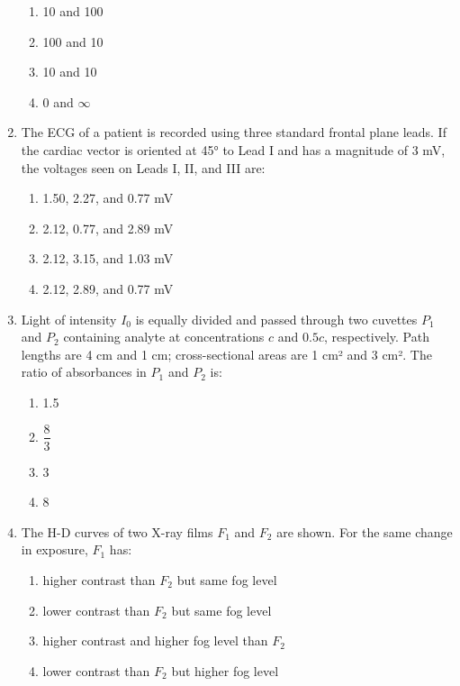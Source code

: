 \documentclass[journal]{IEEEtran}
\begin{document}
\begin{enumerate}
\begin{multicols}{2}
\begin{enumerate}
    \item 10 and 100
    \item 100 and 10
    \item 10 and 10
    \item 0 and $\infty$
\end{enumerate}
\end{multicols}

\item The ECG of a patient is recorded using three standard frontal plane leads. If the cardiac vector is oriented at 45° to Lead I and has a magnitude of 3 mV, the voltages seen on Leads I, II, and III are:

\begin{multicols}{2}
\begin{enumerate}
    \item 1.50, 2.27, and 0.77 mV
    \item 2.12, 0.77, and 2.89 mV
    \item 2.12, 3.15, and 1.03 mV
    \item 2.12, 2.89, and 0.77 mV
\end{enumerate}
\end{multicols}

\item Light of intensity $I_0$ is equally divided and passed through two cuvettes $P_1$ and $P_2$ containing analyte at concentrations $c$ and $0.5c$, respectively. Path lengths are 4 cm and 1 cm; cross-sectional areas are 1 cm² and 3 cm². The ratio of absorbances in $P_1$ and $P_2$ is:

\begin{multicols}{2}
\begin{enumerate}
    \item 1.5
    \item $\dfrac{8}{3}$
    \item 3
    \item 8
\end{enumerate}
\end{multicols}

\item The H-D curves of two X-ray films $F_1$ and $F_2$ are shown. For the same change in exposure, $F_1$ has:

\begin{multicols}{2}
\begin{enumerate}
    \item higher contrast than $F_2$ but same fog level
    \item lower contrast than $F_2$ but same fog level
    \item higher contrast and higher fog level than $F_2$
    \item lower contrast than $F_2$ but higher fog level
\end{enumerate}
\end{multicols}


\end{enumerate}
\end{document}
